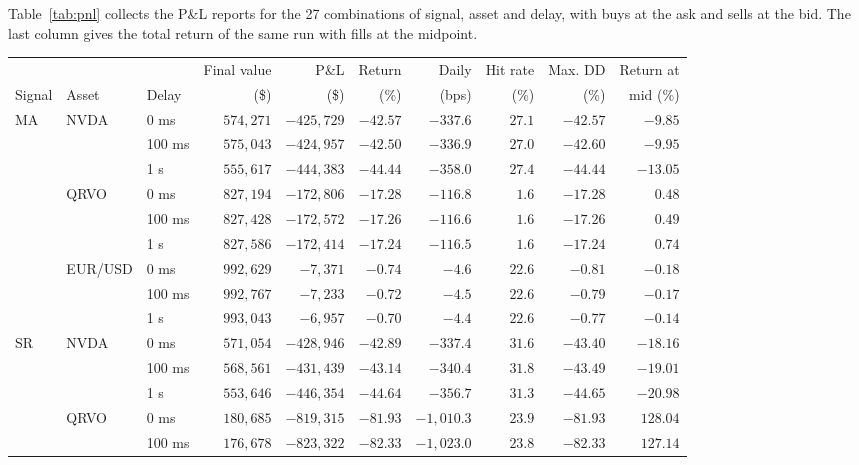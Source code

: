 \documentclass{article}
\begin{document}
\noindent Table~\ref{tab:pnl} collects the P\&L reports for the 27 combinations of signal, asset and delay, with buys at the ask and sells at the bid. The last column gives the total return of the same run with fills at the midpoint.

\begin{table}[H]
\centering
\small
\setlength{\tabcolsep}{5pt}
\begin{tabular}{lllrrrrrrr}
\toprule
 & & & Final value & P\&L & Return & Daily & Hit rate & Max. DD & Return at \\
Signal & Asset & Delay & (\$) & (\$) & (\%) & (bps) & (\%) & (\%) & mid (\%) \\
\midrule
MA & NVDA & 0 ms & $574{,}271$ & $-425{,}729$ & $-42.57$ & $-337.6$ & $27.1$ & $-42.57$ & $-9.85$ \\
 &  & 100 ms & $575{,}043$ & $-424{,}957$ & $-42.50$ & $-336.9$ & $27.0$ & $-42.60$ & $-9.95$ \\
 &  & 1 s & $555{,}617$ & $-444{,}383$ & $-44.44$ & $-358.0$ & $27.4$ & $-44.44$ & $-13.05$ \\
\addlinespace[2pt]
 & QRVO & 0 ms & $827{,}194$ & $-172{,}806$ & $-17.28$ & $-116.8$ & $1.6$ & $-17.28$ & $0.48$ \\
 &  & 100 ms & $827{,}428$ & $-172{,}572$ & $-17.26$ & $-116.6$ & $1.6$ & $-17.26$ & $0.49$ \\
 &  & 1 s & $827{,}586$ & $-172{,}414$ & $-17.24$ & $-116.5$ & $1.6$ & $-17.24$ & $0.74$ \\
\addlinespace[2pt]
 & EUR/USD & 0 ms & $992{,}629$ & $-7{,}371$ & $-0.74$ & $-4.6$ & $22.6$ & $-0.81$ & $-0.18$ \\
 &  & 100 ms & $992{,}767$ & $-7{,}233$ & $-0.72$ & $-4.5$ & $22.6$ & $-0.79$ & $-0.17$ \\
 &  & 1 s & $993{,}043$ & $-6{,}957$ & $-0.70$ & $-4.4$ & $22.6$ & $-0.77$ & $-0.14$ \\
\midrule
SR & NVDA & 0 ms & $571{,}054$ & $-428{,}946$ & $-42.89$ & $-337.4$ & $31.6$ & $-43.40$ & $-18.16$ \\
 &  & 100 ms & $568{,}561$ & $-431{,}439$ & $-43.14$ & $-340.4$ & $31.8$ & $-43.49$ & $-19.01$ \\
 &  & 1 s & $553{,}646$ & $-446{,}354$ & $-44.64$ & $-356.7$ & $31.3$ & $-44.65$ & $-20.98$ \\
\addlinespace[2pt]
 & QRVO & 0 ms & $180{,}685$ & $-819{,}315$ & $-81.93$ & $-1{,}010.3$ & $23.9$ & $-81.93$ & $128.04$ \\
 &  & 100 ms & $176{,}678$ & $-823{,}322$ & $-82.33$ & $-1{,}023.0$ & $23.8$ & $-82.33$ & $127.14$ \\

\end{tabular}
\end{table}
\end{document}
